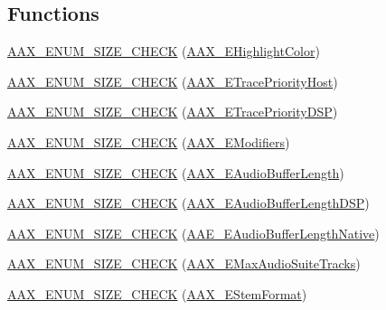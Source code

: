 \subsection*{Functions}
\begin{DoxyCompactItemize}
\item 
\hyperlink{a00206_aa804ea73d26c782b262ab44521f221be}{A\+A\+X\+\_\+\+E\+N\+U\+M\+\_\+\+S\+I\+Z\+E\+\_\+\+C\+H\+E\+C\+K} (\hyperlink{a00206_a143056a07989a48e5db3a101f1b12567}{A\+A\+X\+\_\+\+E\+Highlight\+Color})
\item 
\hyperlink{a00206_aedc60d38ce267f07f0400acac7a19a6f}{A\+A\+X\+\_\+\+E\+N\+U\+M\+\_\+\+S\+I\+Z\+E\+\_\+\+C\+H\+E\+C\+K} (\hyperlink{a00206_a2dd667e4dea5781f38832fd9f1725f1b}{A\+A\+X\+\_\+\+E\+Trace\+Priority\+Host})
\item 
\hyperlink{a00206_a3bd6010dea2dc5068463159871e3f69d}{A\+A\+X\+\_\+\+E\+N\+U\+M\+\_\+\+S\+I\+Z\+E\+\_\+\+C\+H\+E\+C\+K} (\hyperlink{a00206_ac564db2d51bc55990fb37ab02062346c}{A\+A\+X\+\_\+\+E\+Trace\+Priority\+D\+S\+P})
\item 
\hyperlink{a00206_a3383a38a91fa5321820b04e86c444a0e}{A\+A\+X\+\_\+\+E\+N\+U\+M\+\_\+\+S\+I\+Z\+E\+\_\+\+C\+H\+E\+C\+K} (\hyperlink{a00206_a47756e0a56d00468b7045eb26500cb78}{A\+A\+X\+\_\+\+E\+Modifiers})
\item 
\hyperlink{a00206_ac3eb97829e14e794da3579961b62a104}{A\+A\+X\+\_\+\+E\+N\+U\+M\+\_\+\+S\+I\+Z\+E\+\_\+\+C\+H\+E\+C\+K} (\hyperlink{a00206_ada5e011bdfdc6a996de752662b3dfbe7}{A\+A\+X\+\_\+\+E\+Audio\+Buffer\+Length})
\item 
\hyperlink{a00206_a48bf8941ced9fee5fcd741e21249ad6a}{A\+A\+X\+\_\+\+E\+N\+U\+M\+\_\+\+S\+I\+Z\+E\+\_\+\+C\+H\+E\+C\+K} (\hyperlink{a00206_ab33e0f1ecf04ca4161fa8d8de5845d67}{A\+A\+X\+\_\+\+E\+Audio\+Buffer\+Length\+D\+S\+P})
\item 
\hyperlink{a00206_ab9f66e624033efd4206cada3c3df897c}{A\+A\+X\+\_\+\+E\+N\+U\+M\+\_\+\+S\+I\+Z\+E\+\_\+\+C\+H\+E\+C\+K} (\hyperlink{a00206_aa1769ee466fd07659d8c7ef5ac61cd49}{A\+A\+E\+\_\+\+E\+Audio\+Buffer\+Length\+Native})
\item 
\hyperlink{a00206_a33eb853a54e3b198df70fc4586aaf145}{A\+A\+X\+\_\+\+E\+N\+U\+M\+\_\+\+S\+I\+Z\+E\+\_\+\+C\+H\+E\+C\+K} (\hyperlink{a00206_af94bcc724bc9a54eb8a83a664c0b1b48}{A\+A\+X\+\_\+\+E\+Max\+Audio\+Suite\+Tracks})
\item 
\hyperlink{a00206_a9c68c20c5e598eafcebd9046f5160164}{A\+A\+X\+\_\+\+E\+N\+U\+M\+\_\+\+S\+I\+Z\+E\+\_\+\+C\+H\+E\+C\+K} (\hyperlink{a00206_ad8af5ef008b2bd478add9a0acb0a1d85}{A\+A\+X\+\_\+\+E\+Stem\+Format})

\end{DoxyCompactItemize}
